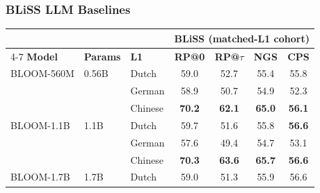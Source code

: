 




\clearpage
\newpage 
\subsubsection{BLiSS LLM Baselines}
\begin{table}[t]
\centering\scriptsize
\setlength{\tabcolsep}{3pt}
\begin{minipage}[t]{0.49\linewidth}\centering
\begin{tabular}{ll l cccc}
\toprule
& & & \multicolumn{4}{c}{\textbf{BLiSS (matched-L1 cohort)}} \\
\cmidrule(lr){4-7}
\textbf{Model} & \textbf{Params} & \textbf{L1} & \textbf{RP@0} & \textbf{RP@$\tau$} & \textbf{NGS} & \textbf{CPS} \\
\midrule
BLOOM-560M & 0.56B & Dutch & \cellcolor[rgb]{0.906,1.000,0.906} 59.0 & \cellcolor[rgb]{0.966,1.000,0.966} 52.7 & \cellcolor[rgb]{0.929,1.000,0.929} 55.4 & \cellcolor[rgb]{0.881,1.000,0.881} 55.8 \\
 &  & German & \cellcolor[rgb]{0.907,1.000,0.907} 58.9 & \cellcolor[rgb]{0.991,1.000,0.991} 50.7 & \cellcolor[rgb]{0.935,1.000,0.935} 54.9 & \cellcolor[rgb]{0.953,1.000,0.953} 52.3 \\
 &  & Chinese & \cellcolor[rgb]{0.789,1.000,0.789} \textbf{70.2} & \cellcolor[rgb]{0.847,1.000,0.847} \textbf{62.1} & \cellcolor[rgb]{0.801,1.000,0.801} \textbf{65.0} & \cellcolor[rgb]{0.875,1.000,0.875} \textbf{56.1} \\
\addlinespace[2pt]
BLOOM-1.1B & 1.1B & Dutch & \cellcolor[rgb]{0.899,1.000,0.899} 59.7 & \cellcolor[rgb]{0.980,1.000,0.980} 51.6 & \cellcolor[rgb]{0.923,1.000,0.923} 55.8 & \cellcolor[rgb]{0.865,1.000,0.865} \textbf{56.6} \\
 &  & German & \cellcolor[rgb]{0.921,1.000,0.921} 57.6 & \cellcolor[rgb]{1.000,0.994,0.994} 49.4 & \cellcolor[rgb]{0.938,1.000,0.938} 54.7 & \cellcolor[rgb]{0.937,1.000,0.937} 53.1 \\
 &  & Chinese & \cellcolor[rgb]{0.788,1.000,0.788} \textbf{70.3} & \cellcolor[rgb]{0.828,1.000,0.828} \textbf{63.6} & \cellcolor[rgb]{0.792,1.000,0.792} \textbf{65.7} & \cellcolor[rgb]{0.865,1.000,0.865} \textbf{56.6} \\
\addlinespace[2pt]
BLOOM-1.7B & 1.7B & Dutch & \cellcolor[rgb]{0.906,1.000,0.906} 59.0 & \cellcolor[rgb]{0.984,1.000,0.984} 51.3 & \cellcolor[rgb]{0.922,1.000,0.922} 55.9 & \cellcolor[rgb]{0.865,1.000,0.865} 56.6 \\

\end{tabular}
\end{minipage}
\end{table}
